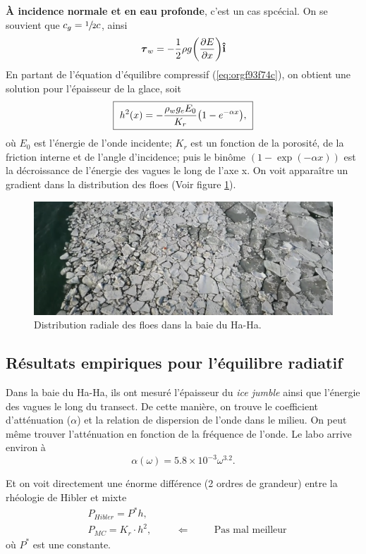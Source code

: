 \documentclass[10pt]{article}
\numberwithin{equation}{section}
\newcommand{\ivf}{\vb{\hat{i}}}
\begin{document}
\textbf{À incidence normale et en eau profonde}, c'est un cas spcécial.
On se souvient que \(c_g = \sfrac{1}{2} c\), ainsi
\begin{equation}
   \boldsymbol{\tau}_w = -\frac{1}{2}\rho g \qty(\pdv{E}{x}) \ivf
\end{equation}
En partant de l'équation d'équilibre compressif (\ref{eq:orgf93f74c}), on obtient une solution pour l'épaisseur de la glace, soit
\begin{equation}
   \boxed{\ h^2(x) = - \frac{\rho_w g_e E_0}{K_r}\qty(1-e^{-\alpha x}),\ }
\end{equation}
où \(E_0\) est l'énergie de l'onde incidente; \(K_r\) est un fonction de la porosité, de la friction interne et de l'angle d'incidence; puis le binôme \((1-\exp(-\alpha x))\) est la décroissance de l'énergie des vagues le long de l'axe x.
On voit apparaître un gradient dans la distribution des floes (Voir figure \ref{fig:org6eaebd6}).

\begin{figure}[htbp]
\centering
\includegraphics[width=.9\linewidth]{Figures/photos/gradient_floes.png}
\caption{\label{fig:org6eaebd6}Distribution radiale des floes dans la baie du Ha-Ha.}
\end{figure}
\subsection{Résultats empiriques pour l'équilibre radiatif}
\label{sec:orged2f2fe}

Dans la baie du Ha-Ha, ils ont mesuré l'épaisseur du \emph{ice jumble} ainsi que l'énergie des vagues le long du transect.
De cette manière, on trouve le coefficient d'atténuation (\(\alpha\))  et la relation de dispersion de l'onde dans le milieu.
On peut même trouver l'atténuation en fonction de la fréquence de l'onde.
Le labo arrive environ à
\begin{equation}
   \alpha(\omega)  = 5.8 \times 10^{-3} \omega^{3.2}.
\end{equation}

Et on voit directement une énorme différence (2 ordres de grandeur) entre la rhéologie de Hibler et mixte
\begin{align}
   &P_{Hibler} = P^* h,\\
   &P_{MC} = K_r \cdot h^2, \hspace{1cm}\Leftarrow\hspace{1cm}\text{Pas mal meilleur}
\end{align}
où \(P^*\) est une constante.
\end{document}
